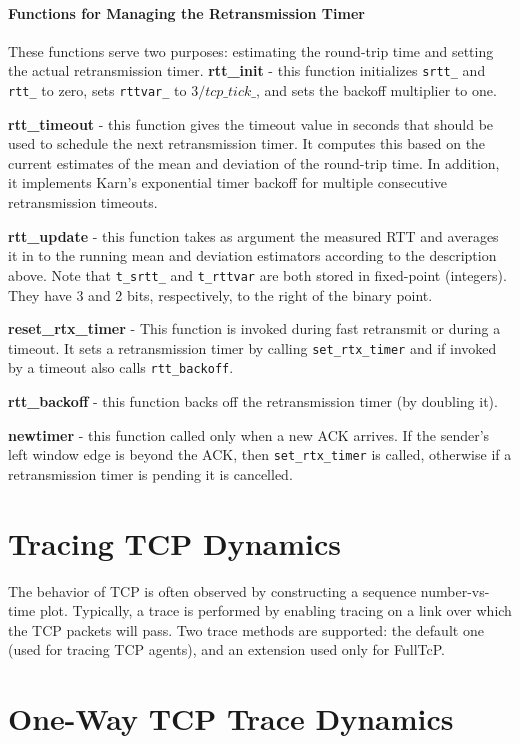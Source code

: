 \paragraph{Functions for Managing the Retransmission Timer}

These functions serve two purposes: estimating the round-trip time
and setting the actual retransmission timer.
{\bf rtt\_init} - this function initializes {\tt srtt\_} and {\tt rtt\_}
to zero, sets {\tt rttvar\_} to $3/tcp\_tick\_$, and sets the backoff
multiplier to one.

{\bf rtt\_timeout} - this function gives the timeout value in seconds that
should be used to schedule the next retransmission timer.
It computes this based on the current estimates of the mean and deviation
of the round-trip time.  In addition, it implements Karn's
exponential timer backoff for multiple consecutive retransmission timeouts.

{\bf rtt\_update} - this function takes as argument the measured RTT
and averages it in to the running mean and deviation estimators
according to the description above.
Note that {\tt t\_srtt\_} and {\tt t\_rttvar} are both
stored in fixed-point (integers).
They have 3 and 2 bits, respectively, to the right of the binary
point.

{\bf reset\_rtx\_timer} -  This function is invoked during fast retransmit
or during a timeout.
It sets a retransmission timer
by calling {\tt set\_rtx\_timer} and if invoked by a timeout also calls
{\tt rtt\_backoff}.

{\bf rtt\_backoff} - this function backs off the retransmission timer
(by doubling it).

{\bf newtimer} - this function called only when a new ACK arrives.
If the sender's left window edge is beyond the ACK, then
{\tt set\_rtx\_timer} is called, otherwise if a retransmission timer
is pending it is cancelled.

\section{Tracing TCP Dynamics}
\label{sec:traceTcpdyn}

The behavior of TCP is often observed by constructing a
sequence number-vs-time plot.
Typically, a trace is performed by enabling tracing on a link
over which the TCP packets will pass.
Two trace methods are supported: the default one (used for tracing
TCP agents), and an extension used only for FullTcP.

\section{One-Way TCP Trace Dynamics}
\label{sec:trace1WayTcpdyn}

